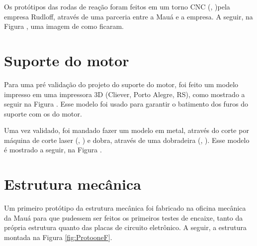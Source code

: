 \documentclass[
	12pt,				%
	openany,			%
	twoside,			%
	a4paper,			%
	english,			%
	french,				%
	spanish,			%
	brazil,				%
	oldfontcommands
	]{abntex2}
\begin{document}
Os protótipos das rodas de reação foram feitos em um torno CNC (, )pela empresa Rudloff, através de uma parceria entre a Mauá e a empresa. A seguir, na Figura , uma imagem de como ficaram.

%	

\section{Suporte do motor}

Para uma pré validação do projeto do suporte do motor, foi feito um modelo impresso em uma impressora 3D (Cliever, Porto Alegre, RS), como mostrado a seguir na Figura . Esse modelo foi usado para garantir o batimento dos furos do suporte com os do motor.

%	

Uma vez validado, foi mandado fazer um modelo em metal, através do corte por máquina de corte laser (, ) e dobra, através de uma dobradeira (, ). Esse modelo é mostrado a seguir, na Figura .

%	

\section{Estrutura mecânica}

Um primeiro protótipo da estrutura mecânica foi fabricado na oficina mecânica da Mauá para que pudessem ser feitos os primeiros testes de encaixe, tanto da própria estrutura quanto das placas de circuito eletrônico. A seguir, a estrutura montada na Figura \ref{fig:ProtooneF}.
\end{document}
